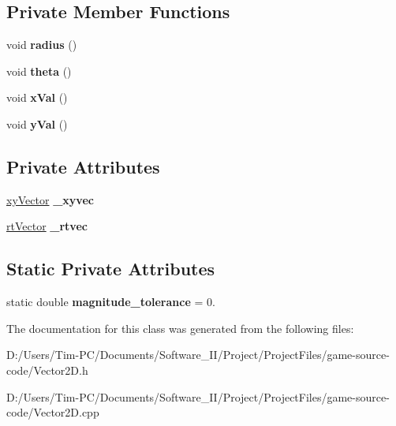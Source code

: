 \subsection*{Private Member Functions}
\begin{DoxyCompactItemize}
\item 
\mbox{\label{class_vector2_d_a86eb002af3d4ce9ee892691165577bd9}} 
void {\bfseries radius} ()
\item 
\mbox{\label{class_vector2_d_a77801c0448846bc99cea64b232e262ed}} 
void {\bfseries theta} ()
\item 
\mbox{\label{class_vector2_d_a2aa1adc699bfc5a490875d26c1e6da04}} 
void {\bfseries x\+Val} ()
\item 
\mbox{\label{class_vector2_d_ab202ce3f9065cdbf5d981b0f34c66feb}} 
void {\bfseries y\+Val} ()
\end{DoxyCompactItemize}
\subsection*{Private Attributes}
\begin{DoxyCompactItemize}
\item 
\mbox{\label{class_vector2_d_a151b8b70d16a3bf4544af58c2a721242}} 
\hyperlink{structxy_vector}{xy\+Vector} {\bfseries \+\_\+xyvec}
\item 
\mbox{\label{class_vector2_d_a97b229bece3801330df9ef710d0296e9}} 
\hyperlink{structrt_vector}{rt\+Vector} {\bfseries \+\_\+rtvec}
\end{DoxyCompactItemize}
\subsection*{Static Private Attributes}
\begin{DoxyCompactItemize}
\item 
\mbox{\label{class_vector2_d_a50a94297b6c05c07ee29900a438492a9}} 
static double {\bfseries magnitude\+\_\+tolerance} = 0.
\end{DoxyCompactItemize}


The documentation for this class was generated from the following files\+:\begin{DoxyCompactItemize}
\item 
D\+:/\+Users/\+Tim-\/\+P\+C/\+Documents/\+Software\+\_\+\+I\+I/\+Project/\+Project\+Files/game-\/source-\/code/Vector2\+D.\+h\item 
D\+:/\+Users/\+Tim-\/\+P\+C/\+Documents/\+Software\+\_\+\+I\+I/\+Project/\+Project\+Files/game-\/source-\/code/Vector2\+D.\+cpp\end{DoxyCompactItemize}
